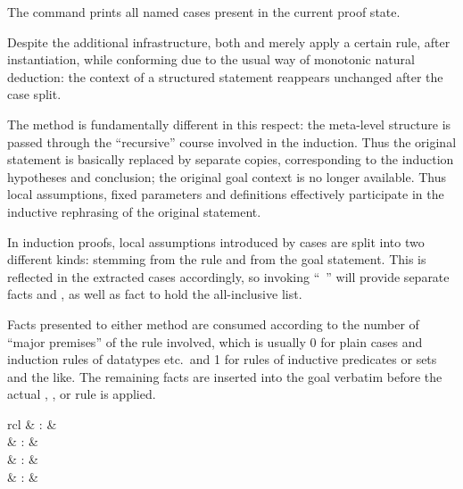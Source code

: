 \begin{isabellebody}
\begin{isamarkuptext}
  The \mbox{} command prints all named cases present
  in the current proof state.

  \medskip Despite the additional infrastructure, both \mbox{}
  and \mbox{} merely apply a certain rule, after
  instantiation, while conforming due to the usual way of monotonic
  natural deduction: the context of a structured statement 
  reappears unchanged after the case split.

  The \mbox{} method is fundamentally different in this
  respect: the meta-level structure is passed through the
  ``recursive'' course involved in the induction.  Thus the original
  statement is basically replaced by separate copies, corresponding to
  the induction hypotheses and conclusion; the original goal context
  is no longer available.  Thus local assumptions, fixed parameters
  and definitions effectively participate in the inductive rephrasing
  of the original statement.

  In induction proofs, local assumptions introduced by cases are split
  into two different kinds:  stemming from the rule and
   from the goal statement.  This is reflected in the
  extracted cases accordingly, so invoking ``\mbox{}~'' will provide separate facts  and ,
  as well as fact  to hold the all-inclusive list.

  \medskip Facts presented to either method are consumed according to
  the number of ``major premises'' of the rule involved, which is
  usually 0 for plain cases and induction rules of datatypes etc.\ and
  1 for rules of inductive predicates or sets and the like.  The
  remaining facts are inserted into the goal verbatim before the
  actual , , or  rule is
  applied.%
\end{isamarkuptext}%
\isamarkuptrue%
%
\isamarkuptrue%
%
\begin{isamarkuptext}%
\begin{matharray}{rcl}
    \mbox{}\isa{\isactrlsup {\isacharasterisk}} & : &  \\
    \mbox{} & : & \isaratt \\
    \mbox{} & : & \isaratt \\
    \mbox{} & : & \isaratt \\
  \end{matharray}


\end{isamarkuptext}
\end{isabellebody}
